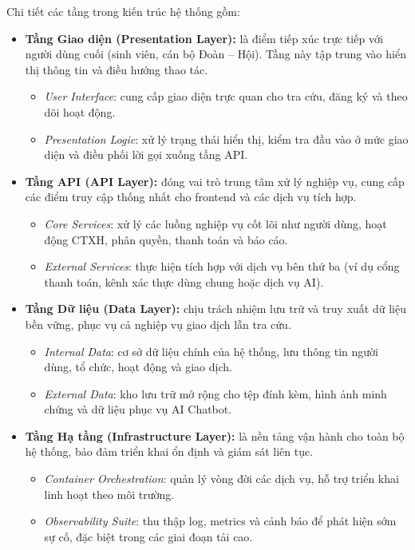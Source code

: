 Chi tiết các tầng trong kiến trúc hệ thống gồm:
\begin{itemize}
    \item \textbf{Tầng Giao diện (Presentation Layer):} là điểm tiếp xúc trực tiếp với người dùng cuối (sinh viên, cán bộ Đoàn -- Hội). Tầng này tập trung vào hiển thị thông tin và điều hướng thao tác.
    \begin{itemize}
        \item \textit{User Interface}: cung cấp giao diện trực quan cho tra cứu, đăng ký và theo dõi hoạt động.
        \item \textit{Presentation Logic}: xử lý trạng thái hiển thị, kiểm tra đầu vào ở mức giao diện và điều phối lời gọi xuống tầng API.
    \end{itemize}

    \item \textbf{Tầng API (API Layer):} đóng vai trò trung tâm xử lý nghiệp vụ, cung cấp các điểm truy cập thống nhất cho frontend và các dịch vụ tích hợp.
    \begin{itemize}
        \item \textit{Core Services}: xử lý các luồng nghiệp vụ cốt lõi như người dùng, hoạt động CTXH, phân quyền, thanh toán và báo cáo.
        \item \textit{External Services}: thực hiện tích hợp với dịch vụ bên thứ ba (ví dụ cổng thanh toán, kênh xác thực dùng chung hoặc dịch vụ AI).
    \end{itemize}

    \item \textbf{Tầng Dữ liệu (Data Layer):} chịu trách nhiệm lưu trữ và truy xuất dữ liệu bền vững, phục vụ cả nghiệp vụ giao dịch lẫn tra cứu.
    \begin{itemize}
        \item \textit{Internal Data}: cơ sở dữ liệu chính của hệ thống, lưu thông tin người dùng, tổ chức, hoạt động và giao dịch.
        \item \textit{External Data}: kho lưu trữ mở rộng cho tệp đính kèm, hình ảnh minh chứng và dữ liệu phục vụ AI Chatbot.
    \end{itemize}

    \item \textbf{Tầng Hạ tầng (Infrastructure Layer):} là nền tảng vận hành cho toàn bộ hệ thống, bảo đảm triển khai ổn định và giám sát liên tục.
    \begin{itemize}
        \item \textit{Container Orchestration}: quản lý vòng đời các dịch vụ, hỗ trợ triển khai linh hoạt theo môi trường.
        \item \textit{Observability Suite}: thu thập log, metrics và cảnh báo để phát hiện sớm sự cố, đặc biệt trong các giai đoạn tải cao.
    \end{itemize}
\end{itemize}

